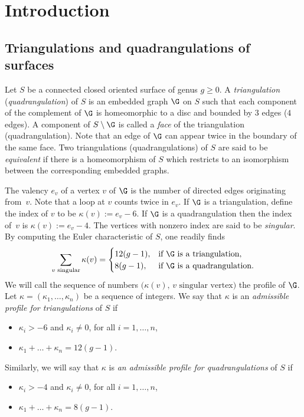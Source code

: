 \section{Introduction}\label{sec:intro}
\subsection{Triangulations and quadrangulations of surfaces}\label{sec:triang:quad}
Let $S$ be a connected closed oriented surface of genus $g \geq 0$. A \emph{triangulation} (\resp \emph{quadrangulation}) of $S$ is an embedded graph $\G$ on $S$ such that each component of the complement of $\G$ is homeomorphic to a disc and bounded by $3$ edges (\resp $4$ edges). A component of $S\setminus \G$ is called a \emph{face} of the triangulation (\resp quadrangulation). Note that an edge of $\G$ can appear twice in the boundary of the same face. Two triangulations (\resp quadrangulations) of $S$ are said to be \emph{equivalent} if there is a homeomorphism of $S$ which restricts to an isomorphism between the corresponding embedded graphs.

The valency $e_v$ of a vertex $v$ of $\G$ is the number of directed edges originating from~$v$. Note that a loop at $v$ counts twice in $e_v$. If $\G$ is a triangulation, define the index of $v$ to be $\kappa(v):=e_v-6$. If $\G$ is a quadrangulation then the index of~$v$ is $\kappa(v):=e_v-4$. The vertices with nonzero index are said to be \emph{singular}. By computing the Euler characteristic of $S$, one readily finds
\begin{equation}\label{eq:euler:char}
\sum_{v\text{ singular}}\kappa(v)=
\begin{cases}
12(g-1), & \hbox{if $\G$ is a triangulation}, \\
8(g-1), & \hbox{if $\G$ is a quadrangulation}.
\end{cases}
\end{equation}
We will call the sequence of numbers $\bigl(\kappa(v), \, v \textrm{ singular vertex}\bigr)$ the profile of $\G$.
Let $\kappa=(\kappa_1,\dots,\kappa_n)$ be a sequence of integers.
We say that $\kappa$ is an \emph{admissible profile for triangulations} of $S$ if
\begin{itemize}\renewcommand{\labelitemi}{$\scriptstyle\bullet$}
\item
$\kappa_i>-6$ and $\kappa_i\neq 0$, for all $i=1,\dots,n$,
\item
$\kappa_1+\dots+\kappa_n=12(g-1)$.
\end{itemize}
Similarly, we will say that $\kappa$ is \emph{an admissible profile for quadrangulations} of $S$ if
\begin{itemize}\renewcommand{\labelitemi}{$\scriptstyle\bullet$}
\item
$\kappa_i>-4$ and $\kappa_i\neq 0$, for all $i=1,\dots,n$,
\item
$\kappa_1+\dots+\kappa_n=8(g-1)$.
\end{itemize}

